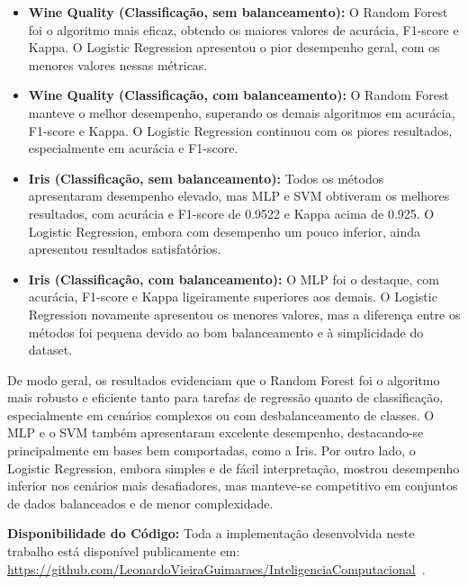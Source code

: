 \begin{itemize}
    \item \textbf{Wine Quality (Classificação, sem balanceamento):} O Random Forest foi o algoritmo mais eficaz, obtendo os maiores valores de acurácia, F1-score e Kappa. O Logistic Regression apresentou o pior desempenho geral, com os menores valores nessas métricas.
    \item \textbf{Wine Quality (Classificação, com balanceamento):} O Random Forest manteve o melhor desempenho, superando os demais algoritmos em acurácia, F1-score e Kappa. O Logistic Regression continuou com os piores resultados, especialmente em acurácia e F1-score.
    \item \textbf{Iris (Classificação, sem balanceamento):} Todos os métodos apresentaram desempenho elevado, mas MLP e SVM obtiveram os melhores resultados, com acurácia e F1-score de 0.9522 e Kappa acima de 0.925. O Logistic Regression, embora com desempenho um pouco inferior, ainda apresentou resultados satisfatórios.
    \item \textbf{Iris (Classificação, com balanceamento):} O MLP foi o destaque, com acurácia, F1-score e Kappa ligeiramente superiores aos demais. O Logistic Regression novamente apresentou os menores valores, mas a diferença entre os métodos foi pequena devido ao bom balanceamento e à simplicidade do dataset.
\end{itemize}

De modo geral, os resultados evidenciam que o Random Forest foi o algoritmo mais robusto e eficiente tanto para tarefas de regressão quanto de classificação, especialmente em cenários complexos ou com desbalanceamento de classes. O MLP e o SVM também apresentaram excelente desempenho, destacando-se principalmente em bases bem comportadas, como a Iris. Por outro lado, o Logistic Regression, embora simples e de fácil interpretação, mostrou desempenho inferior nos cenários mais desafiadores, mas manteve-se competitivo em conjuntos de dados balanceados e de menor complexidade.

\vspace{1em}
\noindent\textbf{Disponibilidade do Código:} Toda a implementação desenvolvida neste trabalho está disponível publicamente em: \url{https://github.com/LeonardoVieiraGuimaraes/InteligenciaComputacional}~\cite{githubIC2025}.




